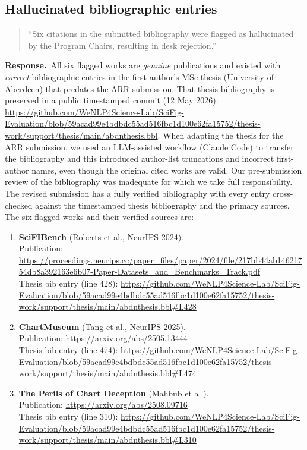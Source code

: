 \documentclass[11pt]{article}
\newenvironment{reviewercomment}{%
  \begin{quote}\small\itshape
}{%
  \end{quote}
}
\newcommand{\response}{\noindent\textbf{Response.}~}
\newcommand{\revisionitem}[3]{%
  \subsection{#1}
  \begin{reviewercomment}
  ``#2''
  \end{reviewercomment}
  \response #3\par
}
\begin{document}
\revisionitem
{Hallucinated bibliographic entries}
{Six citations in the submitted bibliography were flagged as hallucinated by the Program Chairs, resulting in desk rejection.}
{All six flagged works are \emph{genuine} publications and existed with \emph{correct} bibliographic entries in the first author's MSc thesis (University of Aberdeen) that predates the ARR submission. That thesis bibliography is preserved in a public timestamped commit (12 May 2026): \url{https://github.com/WeNLP4Science-Lab/SciFig-Evaluation/blob/59acad99e4bdbdc55ad516fbc1d100e62fa15752/thesis-work/support/thesis/main/abdnthesis.bbl}. When adapting the thesis for the ARR submission, we used an LLM-assisted workflow (Claude Code) to transfer the bibliography and this introduced author-list truncations and incorrect first-author names, even though the original cited works are valid. Our pre-submission review of the bibliography was inadequate for which we take full responsibility. The revised submission has a fully verified bibliography with every entry cross-checked against the timestamped thesis bibliography and the primary sources. The six flagged works and their verified sources are:
\begin{enumerate}[nosep,leftmargin=*]
\item \textbf{SciFIBench} (Roberts et al., NeurIPS 2024).\\
Publication: \url{https://proceedings.neurips.cc/paper_files/paper/2024/file/217bb44ab14621754db8a392163e6b07-Paper-Datasets_and_Benchmarks_Track.pdf}\\
Thesis bib entry (line 428): \url{https://github.com/WeNLP4Science-Lab/SciFig-Evaluation/blob/59acad99e4bdbdc55ad516fbc1d100e62fa15752/thesis-work/support/thesis/main/abdnthesis.bbl#L428}
\item \textbf{ChartMuseum} (Tang et al., NeurIPS 2025).\\
Publication: \url{https://arxiv.org/abs/2505.13444}\\
Thesis bib entry (line 474): \url{https://github.com/WeNLP4Science-Lab/SciFig-Evaluation/blob/59acad99e4bdbdc55ad516fbc1d100e62fa15752/thesis-work/support/thesis/main/abdnthesis.bbl#L474}
\item \textbf{The Perils of Chart Deception} (Mahbub et al.).\\
Publication: \url{https://arxiv.org/abs/2508.09716}\\
Thesis bib entry (line 310): \url{https://github.com/WeNLP4Science-Lab/SciFig-Evaluation/blob/59acad99e4bdbdc55ad516fbc1d100e62fa15752/thesis-work/support/thesis/main/abdnthesis.bbl#L310}

\end{enumerate}}
\end{document}
